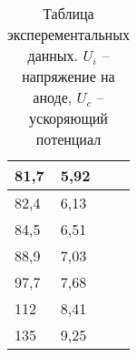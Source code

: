 \begin{table}[h!]
\begin{tabular}{|ll|ll|}
    \multicolumn{1}{|l|}{81,7}    & 5,92                & \multicolumn{1}{l|}{}        &               \\ \hline
    \multicolumn{1}{|l|}{82,4}    & 6,13                & \multicolumn{1}{l|}{}        &               \\ \hline
    \multicolumn{1}{|l|}{84,5}    & 6,51                & \multicolumn{1}{l|}{}        &               \\ \hline
    \multicolumn{1}{|l|}{88,9}    & 7,03                & \multicolumn{1}{l|}{}        &               \\ \hline
    \multicolumn{1}{|l|}{97,7}    & 7,68                & \multicolumn{1}{l|}{}        &               \\ \hline
    \multicolumn{1}{|l|}{112}     & 8,41                & \multicolumn{1}{l|}{}        &               \\ \hline
    \multicolumn{1}{|l|}{135}     & 9,25                & \multicolumn{1}{l|}{}        &               \\ \hline
    \end{tabular}  
    \caption{Таблица эксперементальных данных. $U_i$ -- напряжение на аноде, $U_c$ -- ускоряющий потенциал}
    \label{tab:data}          
\end{table}
    